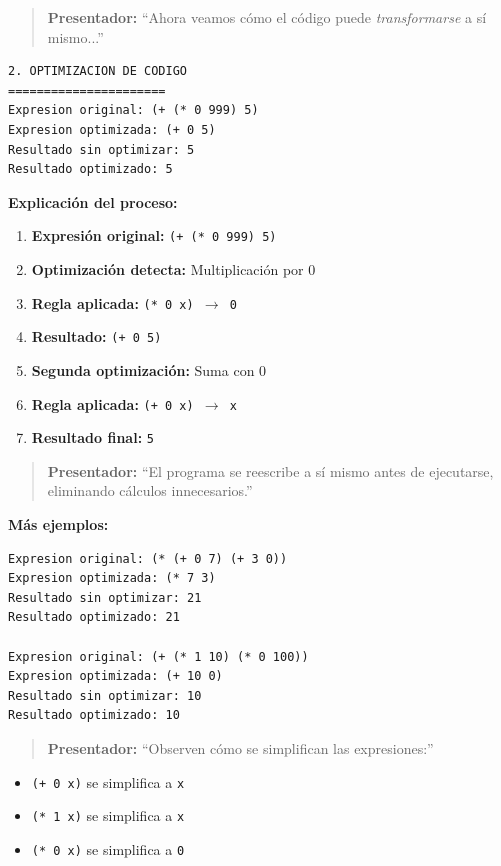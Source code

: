 \documentclass[12pt]{article}
\begin{document}
\begin{quote}
\textbf{Presentador:} ``Ahora veamos cómo el código puede \textit{transformarse} a sí mismo...''
\end{quote}

\begin{verbatim}
2. OPTIMIZACION DE CODIGO
======================
Expresion original: (+ (* 0 999) 5)
Expresion optimizada: (+ 0 5)
Resultado sin optimizar: 5
Resultado optimizado: 5
\end{verbatim}

\textbf{Explicación del proceso:}

\begin{enumerate}
\item \textbf{Expresión original:} \texttt{(+ (* 0 999) 5)}
\item \textbf{Optimización detecta:} Multiplicación por 0
\item \textbf{Regla aplicada:} \texttt{(* 0 x) $\rightarrow$ 0}
\item \textbf{Resultado:} \texttt{(+ 0 5)}
\item \textbf{Segunda optimización:} Suma con 0
\item \textbf{Regla aplicada:} \texttt{(+ 0 x) $\rightarrow$ x}
\item \textbf{Resultado final:} \texttt{5}
\end{enumerate}

\begin{quote}
\textbf{Presentador:} ``El programa se reescribe a sí mismo antes de ejecutarse, eliminando cálculos innecesarios.''
\end{quote}

\textbf{Más ejemplos:}

\begin{verbatim}
Expresion original: (* (+ 0 7) (+ 3 0))
Expresion optimizada: (* 7 3)
Resultado sin optimizar: 21
Resultado optimizado: 21

Expresion original: (+ (* 1 10) (* 0 100))
Expresion optimizada: (+ 10 0)
Resultado sin optimizar: 10
Resultado optimizado: 10
\end{verbatim}

\begin{quote}
\textbf{Presentador:} ``Observen cómo se simplifican las expresiones:''
\end{quote}

\begin{itemize}
\item \texttt{(+ 0 x)} se simplifica a \texttt{x}
\item \texttt{(* 1 x)} se simplifica a \texttt{x}
\item \texttt{(* 0 x)} se simplifica a \texttt{0}
\end{itemize}
\end{document}
